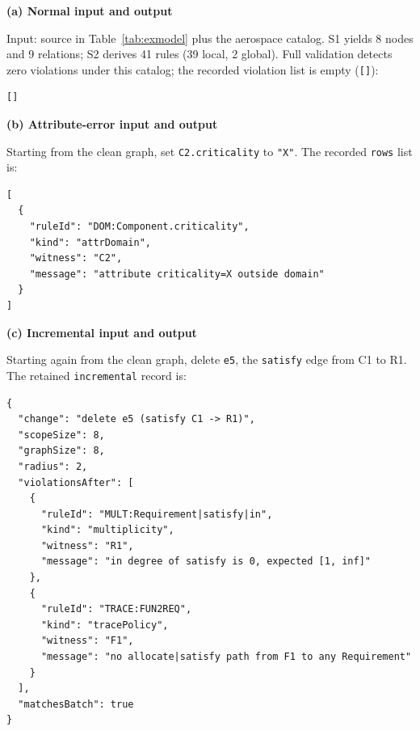 \begin{table}[t]
\centering
\caption{Input changes and recorded validator outputs for the worked example. Each change starts independently from the clean keyword-mode graph; the JSON blocks are excerpts of retained records, not a new API schema. Arrows mark display-only line wraps.}
\label{tab:example-io}
\begin{minipage}[t]{0.48\textwidth}
\vspace{0pt}\small
\textbf{(a) Normal input and output}\par
Input: source in Table~\ref{tab:exmodel} plus the aerospace catalog. S1 yields 8 nodes and 9 relations; S2 derives 41 rules (39 local, 2 global). Full validation detects zero violations under this catalog; the recorded violation list is empty (\texttt{[]}):
\begin{lstlisting}[basicstyle=\ttfamily\fontsize{8}{9}\selectfont,columns=fullflexible,keepspaces=true,breaklines=true,breakatwhitespace=true,postbreak=\mbox{\ensuremath{\hookrightarrow}\space},frame=single,aboveskip=4pt,belowskip=6pt,xleftmargin=3pt,xrightmargin=3pt]
[]
\end{lstlisting}

\textbf{(b) Attribute-error input and output}\par
Starting from the clean graph, set \texttt{C2.criticality} to \texttt{"X"}. The recorded \texttt{rows} list is:
\begin{lstlisting}[basicstyle=\ttfamily\fontsize{8}{9}\selectfont,columns=fullflexible,keepspaces=true,breaklines=true,breakatwhitespace=true,postbreak=\mbox{\ensuremath{\hookrightarrow}\space},frame=single,aboveskip=4pt,belowskip=6pt,xleftmargin=3pt,xrightmargin=3pt]
[
  {
    "ruleId": "DOM:Component.criticality",
    "kind": "attrDomain",
    "witness": "C2",
    "message": "attribute criticality=X outside domain"
  }
]
\end{lstlisting}

\end{minipage}\hfill
\begin{minipage}[t]{0.49\textwidth}
\vspace{0pt}\small
\textbf{(c) Incremental input and output}\par
Starting again from the clean graph, delete \texttt{e5}, the \texttt{satisfy} edge from C1 to R1. The retained \texttt{incremental} record is:
\begin{lstlisting}[basicstyle=\ttfamily\fontsize{8}{9}\selectfont,columns=fullflexible,keepspaces=true,breaklines=true,breakatwhitespace=true,postbreak=\mbox{\ensuremath{\hookrightarrow}\space},frame=single,aboveskip=4pt,belowskip=6pt,xleftmargin=3pt,xrightmargin=3pt]
{
  "change": "delete e5 (satisfy C1 -> R1)",
  "scopeSize": 8,
  "graphSize": 8,
  "radius": 2,
  "violationsAfter": [
    {
      "ruleId": "MULT:Requirement|satisfy|in",
      "kind": "multiplicity",
      "witness": "R1",
      "message": "in degree of satisfy is 0, expected [1, inf]"
    },
    {
      "ruleId": "TRACE:FUN2REQ",
      "kind": "tracePolicy",
      "witness": "F1",
      "message": "no allocate|satisfy path from F1 to any Requirement"
    }
  ],
  "matchesBatch": true
}
\end{lstlisting}

\end{minipage}
\end{table}
